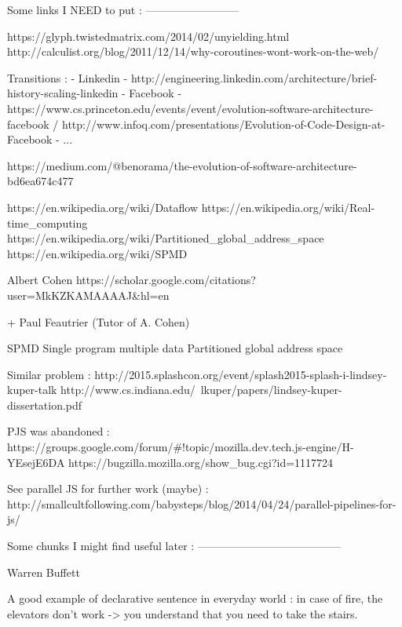 Some links I NEED to put :
--------------------------

https://glyph.twistedmatrix.com/2014/02/unyielding.html
http://calculist.org/blog/2011/12/14/why-coroutines-wont-work-on-the-web/

Transitions :
  - Linkedin - http://engineering.linkedin.com/architecture/brief-history-scaling-linkedin
  - Facebook - https://www.cs.princeton.edu/events/event/evolution-software-architecture-facebook / http://www.infoq.com/presentations/Evolution-of-Code-Design-at-Facebook
  - ... 

https://medium.com/@benorama/the-evolution-of-software-architecture-bd6ea674c477

https://en.wikipedia.org/wiki/Dataflow
https://en.wikipedia.org/wiki/Real-time_computing
https://en.wikipedia.org/wiki/Partitioned_global_address_space
https://en.wikipedia.org/wiki/SPMD

Albert Cohen
https://scholar.google.com/citations?user=MkKZKAMAAAAJ&hl=en

+ Paul Feautrier (Tutor of A. Cohen)


SPMD Single program multiple data
Partitioned global address space


Similar problem :
http://2015.splashcon.org/event/splash2015-splash-i-lindsey-kuper-talk
http://www.cs.indiana.edu/~lkuper/papers/lindsey-kuper-dissertation.pdf

PJS was abandoned :
https://groups.google.com/forum/#!topic/mozilla.dev.tech.js-engine/H-YEsejE6DA
https://bugzilla.mozilla.org/show_bug.cgi?id=1117724

See parallel JS for further work (maybe) :
http://smallcultfollowing.com/babysteps/blog/2014/04/24/parallel-pipelines-for-js/

Some chunks I might find useful later :
---------------------------------------

{Warren Buffett}

A good example of declarative sentence in everyday world : in case of fire, 
the elevators don't work -> you understand that you need to take the stairs.